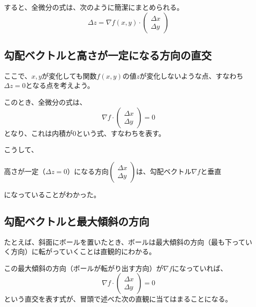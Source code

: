 \documentclass[../../../topic_calculus]{subfiles}
\begin{document}
すると、全微分の式は、次のように簡潔にまとめられる。
\begin{equation*}
  \Delta z = \nabla f(x,y) \cdot \begin{pmatrix} \Delta x \\ \Delta y \end{pmatrix}
\end{equation*}

\subsection{勾配ベクトルと高さが一定になる方向の直交}

ここで、$x,y$が変化しても関数$f(x,y)$の値$z$が変化しないような点、すなわち$\Delta z = 0$となる点を考えよう。

このとき、全微分の式は、
\begin{equation*}
  \nabla f \cdot \begin{pmatrix} \Delta x \\ \Delta y \end{pmatrix} = 0
\end{equation*}
となり、これは内積が0という式、すなわちを表す。

\br

こうして、
\begin{emphabox}
  \begin{spacebox}
    \begin{center}
      高さが一定（$\Delta z = 0$）になる方向$\begin{pmatrix} \Delta x \\ \Delta y \end{pmatrix}$は、勾配ベクトル$\nabla f$と垂直
    \end{center}
  \end{spacebox}
\end{emphabox}
になっていることがわかった。

\subsection{勾配ベクトルと最大傾斜の方向}

たとえば、斜面にボールを置いたとき、ボールは最大傾斜の方向（最も下っていく方向）に転がっていくことは直観的にわかる。

\br

この最大傾斜の方向（ボールが転がり出す方向）が$\nabla f$になっていれば、
\begin{equation*}
  \nabla f \cdot \begin{pmatrix} \Delta x \\ \Delta y \end{pmatrix} = 0
\end{equation*}
という直交を表す式が、冒頭で述べた次の直観に当てはまることになる。
\end{document}
